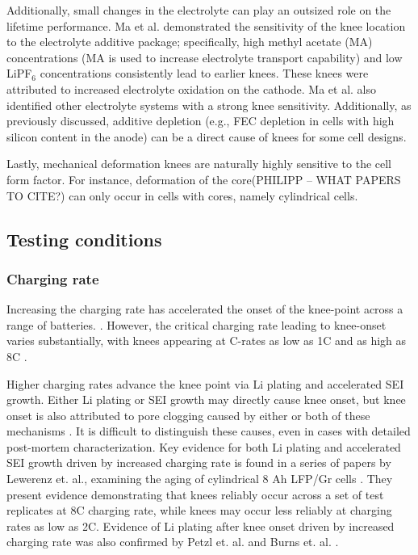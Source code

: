 \documentclass[journal=jpcl, manuscript=article, layout=onecolumn]{achemso}
\begin{document}
Additionally, small changes in the electrolyte can play an outsized role on the lifetime performance. Ma et al.\cite{ma_editors_2019} demonstrated the sensitivity of the knee location to the electrolyte additive package; specifically, high methyl acetate (MA) concentrations (MA is used to increase electrolyte transport capability) and low LiPF$_6$ concentrations consistently lead to earlier knees. These knees were attributed to increased electrolyte oxidation on the cathode. Ma et al.\cite{ma_editors_2019} also identified other electrolyte systems with a strong knee sensitivity. Additionally, as previously discussed, additive depletion (e.g., FEC depletion in cells with high silicon content in the anode) can be a direct cause of knees for some cell designs.

Lastly, mechanical deformation knees are naturally highly sensitive to the cell form factor. For instance, deformation of the core(PHILIPP -- WHAT PAPERS TO CITE?) can only occur in cells with cores, namely cylindrical cells.

\subsection{Testing conditions}

\subsubsection{Charging rate}
Increasing the charging rate has accelerated the onset of the knee-point across a range of batteries. \cite{lewerenz_systematic_2017,lewerenz_post-mortem_2017, petzl_lithium_2015, burns_-situ_2015, waldmann_optimization_2015, schuster_nonlinear_2015, severson_data-driven_2019, schindler_fast_2018, keil_linear_2019}. However, the critical charging rate leading to knee-onset varies substantially, with knees appearing at C-rates as low as 1C \cite{waldmann_optimization_2015} and as high as 8C \cite{lewerenz_systematic_2017}. 

Higher charging rates advance the knee point via Li plating and accelerated SEI growth. Either Li plating or SEI growth may directly cause knee onset, but knee onset is also attributed to pore clogging caused by either or both of these mechanisms \cite{yang_modeling_2017}. It is difficult to distinguish these causes, even in cases with detailed post-mortem characterization. Key evidence for both Li plating and accelerated SEI growth driven by increased charging rate is found in a series of papers by Lewerenz et. al., examining the aging of cylindrical 8 Ah LFP/Gr cells \cite{lewerenz_systematic_2017,lewerenz_post-mortem_2017}. They present evidence demonstrating that knees reliably occur across a set of test replicates at 8C charging rate, while knees may occur less reliably at charging rates as low as 2C. Evidence of Li plating after knee onset driven by increased charging rate was also confirmed by Petzl et. al. \cite{petzl_lithium_2015} and Burns et. al. \cite{burns_-situ_2015}. 
\end{document}
